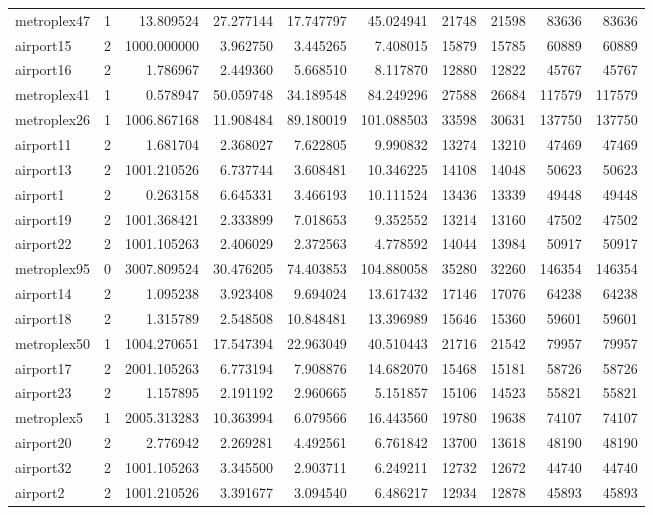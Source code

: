 \begin{longtable}{|l|r|r|r|r|r|r|r|r|r|}
metroplex47 & 1 & 13.809524 & 27.277144 & 17.747797 & 45.024941 & 21748 & 21598 & 83636 & 83636 \\
airport15 & 2 & 1000.000000 & 3.962750 & 3.445265 & 7.408015 & 15879 & 15785 & 60889 & 60889 \\
airport16 & 2 & 1.786967 & 2.449360 & 5.668510 & 8.117870 & 12880 & 12822 & 45767 & 45767 \\
metroplex41 & 1 & 0.578947 & 50.059748 & 34.189548 & 84.249296 & 27588 & 26684 & 117579 & 117579 \\
metroplex26 & 1 & 1006.867168 & 11.908484 & 89.180019 & 101.088503 & 33598 & 30631 & 137750 & 137750 \\
airport11 & 2 & 1.681704 & 2.368027 & 7.622805 & 9.990832 & 13274 & 13210 & 47469 & 47469 \\
airport13 & 2 & 1001.210526 & 6.737744 & 3.608481 & 10.346225 & 14108 & 14048 & 50623 & 50623 \\
airport1 & 2 & 0.263158 & 6.645331 & 3.466193 & 10.111524 & 13436 & 13339 & 49448 & 49448 \\
airport19 & 2 & 1001.368421 & 2.333899 & 7.018653 & 9.352552 & 13214 & 13160 & 47502 & 47502 \\
airport22 & 2 & 1001.105263 & 2.406029 & 2.372563 & 4.778592 & 14044 & 13984 & 50917 & 50917 \\
metroplex95 & 0 & 3007.809524 & 30.476205 & 74.403853 & 104.880058 & 35280 & 32260 & 146354 & 146354 \\
airport14 & 2 & 1.095238 & 3.923408 & 9.694024 & 13.617432 & 17146 & 17076 & 64238 & 64238 \\
airport18 & 2 & 1.315789 & 2.548508 & 10.848481 & 13.396989 & 15646 & 15360 & 59601 & 59601 \\
metroplex50 & 1 & 1004.270651 & 17.547394 & 22.963049 & 40.510443 & 21716 & 21542 & 79957 & 79957 \\
airport17 & 2 & 2001.105263 & 6.773194 & 7.908876 & 14.682070 & 15468 & 15181 & 58726 & 58726 \\
airport23 & 2 & 1.157895 & 2.191192 & 2.960665 & 5.151857 & 15106 & 14523 & 55821 & 55821 \\
metroplex5 & 1 & 2005.313283 & 10.363994 & 6.079566 & 16.443560 & 19780 & 19638 & 74107 & 74107 \\
airport20 & 2 & 2.776942 & 2.269281 & 4.492561 & 6.761842 & 13700 & 13618 & 48190 & 48190 \\
airport32 & 2 & 1001.105263 & 3.345500 & 2.903711 & 6.249211 & 12732 & 12672 & 44740 & 44740 \\
airport2 & 2 & 1001.210526 & 3.391677 & 3.094540 & 6.486217 & 12934 & 12878 & 45893 & 45893 \\

\end{longtable}
